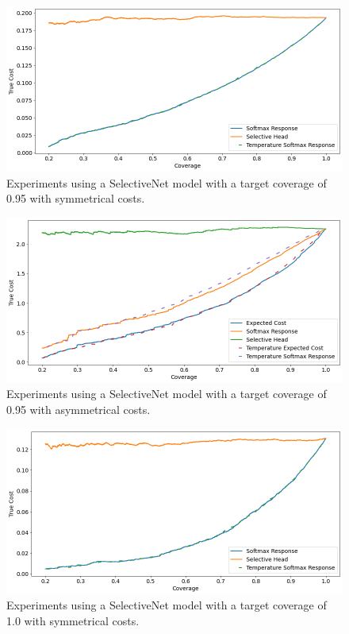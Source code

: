 \begin{figure}[h]
	\includegraphics[width=\textwidth]{images/multi-class/sn0.95-sym.png}
	\caption*{Experiments using a SelectiveNet model with a target coverage of 0.95 with symmetrical costs.}
\end{figure}

\begin{figure}[h]
	\includegraphics[width=\textwidth]{images/multi-class/sn0.95-asym.png}
	\caption*{Experiments using a SelectiveNet model with a target coverage of 0.95 with asymmetrical costs.}
\end{figure}

\begin{figure}[h]
	\includegraphics[width=\textwidth]{images/multi-class/sn1.0-sym.png}
	\caption*{Experiments using a SelectiveNet model with a target coverage of 1.0 with symmetrical costs.}
\end{figure}

